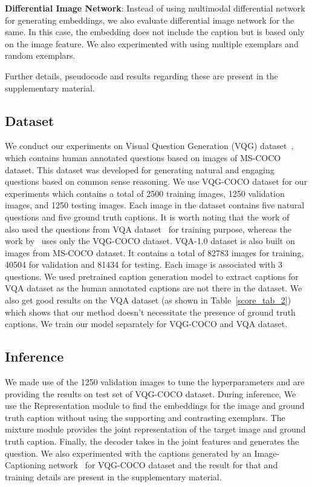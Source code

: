 \documentclass[11pt,a4paper]{article}
\begin{document}
\textbf{Differential Image Network}: Instead of using multimodal differential network for generating embeddings, we also evaluate differential image network for the same. In this case, the embedding does not include the caption but is based only on the image feature. We also experimented with using multiple exemplars and random exemplars.

\noindent Further details, pseudocode and results regarding these are present in the supplementary material.




\subsection{Dataset}
We conduct our experiments on  Visual Question Generation (VQG) dataset~\cite{mostafazadeh2016generating}, which contains human annotated questions based on images of MS-COCO dataset. This dataset was developed for generating natural and engaging questions based on common sense reasoning. We use VQG-COCO dataset for our experiments which contains a total of 2500 training images, 1250 validation images, and 1250 testing images. Each image in the dataset contains five natural questions and five ground truth captions. It is worth noting that the work of~\cite{jain2017creativity} also used the questions from VQA dataset~\cite{VQA} for training purpose, whereas the work by~\cite{mostafazadeh2016generating} uses only the VQG-COCO dataset.
VQA-1.0 dataset is also built on images from MS-COCO dataset. It contains a total of 82783 images for training, 40504 for validation and 81434 for testing. Each image is associated with 3 questions. We used pretrained caption generation model \cite{Karpathy_CVPR2015} to extract captions for VQA dataset as the human annotated captions are not there in the dataset. We also get good results on the VQA dataset (as shown in Table~\ref{score_tab_2}) which shows that our method doesn't necessitate the presence of ground truth captions. We train our model separately for VQG-COCO and VQA dataset.


\subsection{Inference}
We made use of the 1250 validation images to tune the hyperparameters and are providing the results on test set of VQG-COCO dataset. 
During inference, We use the Representation module to find the embeddings for the image and ground truth caption without using the supporting and contrasting exemplars. The mixture module provides the joint representation of the target image and ground truth caption. Finally, the decoder takes in the joint features and generates the question. We also experimented with the captions generated by an Image-Captioning network~\cite{Karpathy_CVPR2015} for VQG-COCO dataset and the result for that and training details are present in the supplementary material.
\end{document}
